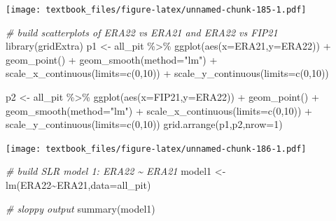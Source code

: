 \documentclass[
  11pt,
]{book}
\newenvironment{Shaded}{\begin{snugshade}}{\end{snugshade}}
\newcommand{\AttributeTok}[1]{\textcolor[rgb]{0.77,0.63,0.00}{#1}}
\newcommand{\CommentTok}[1]{\textcolor[rgb]{0.56,0.35,0.01}{\textit{#1}}}
\newcommand{\DecValTok}[1]{\textcolor[rgb]{0.00,0.00,0.81}{#1}}
\newcommand{\FunctionTok}[1]{\textcolor[rgb]{0.00,0.00,0.00}{#1}}
\newcommand{\NormalTok}[1]{#1}
\newcommand{\OtherTok}[1]{\textcolor[rgb]{0.56,0.35,0.01}{#1}}
\newcommand{\SpecialCharTok}[1]{\textcolor[rgb]{0.00,0.00,0.00}{#1}}
\newcommand{\StringTok}[1]{\textcolor[rgb]{0.31,0.60,0.02}{#1}}
\theoremstyle{definition}
\theoremstyle{definition}
\theoremstyle{definition}
\theoremstyle{definition}
\theoremstyle{remark}
\begin{document}
\texttt{[image: textbook\_files/figure-latex/unnamed-chunk-185-1.pdf]}

\newpage

\begin{Shaded}
\begin{Highlighting}[]
\CommentTok{\# build scatterplots of ERA22 vs ERA21 and ERA22 vs FIP21}
\FunctionTok{library}\NormalTok{(gridExtra)}
\NormalTok{p1 }\OtherTok{\textless{}{-}}\NormalTok{ all\_pit }\SpecialCharTok{\%\textgreater{}\%} \FunctionTok{ggplot}\NormalTok{(}\FunctionTok{aes}\NormalTok{(}\AttributeTok{x=}\NormalTok{ERA21,}\AttributeTok{y=}\NormalTok{ERA22)) }\SpecialCharTok{+}
  \FunctionTok{geom\_point}\NormalTok{() }\SpecialCharTok{+}
  \FunctionTok{geom\_smooth}\NormalTok{(}\AttributeTok{method=}\StringTok{"lm"}\NormalTok{) }\SpecialCharTok{+}
  \FunctionTok{scale\_x\_continuous}\NormalTok{(}\AttributeTok{limits=}\FunctionTok{c}\NormalTok{(}\DecValTok{0}\NormalTok{,}\DecValTok{10}\NormalTok{)) }\SpecialCharTok{+}
  \FunctionTok{scale\_y\_continuous}\NormalTok{(}\AttributeTok{limits=}\FunctionTok{c}\NormalTok{(}\DecValTok{0}\NormalTok{,}\DecValTok{10}\NormalTok{))}

\NormalTok{p2 }\OtherTok{\textless{}{-}}\NormalTok{ all\_pit }\SpecialCharTok{\%\textgreater{}\%} \FunctionTok{ggplot}\NormalTok{(}\FunctionTok{aes}\NormalTok{(}\AttributeTok{x=}\NormalTok{FIP21,}\AttributeTok{y=}\NormalTok{ERA22)) }\SpecialCharTok{+}
  \FunctionTok{geom\_point}\NormalTok{() }\SpecialCharTok{+}
  \FunctionTok{geom\_smooth}\NormalTok{(}\AttributeTok{method=}\StringTok{"lm"}\NormalTok{) }\SpecialCharTok{+}
  \FunctionTok{scale\_x\_continuous}\NormalTok{(}\AttributeTok{limits=}\FunctionTok{c}\NormalTok{(}\DecValTok{0}\NormalTok{,}\DecValTok{10}\NormalTok{)) }\SpecialCharTok{+}
  \FunctionTok{scale\_y\_continuous}\NormalTok{(}\AttributeTok{limits=}\FunctionTok{c}\NormalTok{(}\DecValTok{0}\NormalTok{,}\DecValTok{10}\NormalTok{))}
\FunctionTok{grid.arrange}\NormalTok{(p1,p2,}\AttributeTok{nrow=}\DecValTok{1}\NormalTok{)}
\end{Highlighting}
\end{Shaded}

\texttt{[image: textbook\_files/figure-latex/unnamed-chunk-186-1.pdf]}

\newpage

\begin{Shaded}
\begin{Highlighting}[]
\CommentTok{\# build SLR model 1: ERA22 \textasciitilde{} ERA21}
\NormalTok{model1 }\OtherTok{\textless{}{-}} \FunctionTok{lm}\NormalTok{(ERA22}\SpecialCharTok{\textasciitilde{}}\NormalTok{ERA21,}\AttributeTok{data=}\NormalTok{all\_pit)}

\CommentTok{\# sloppy output}
\FunctionTok{summary}\NormalTok{(model1)}
\end{Highlighting}
\end{Shaded}
\end{document}
